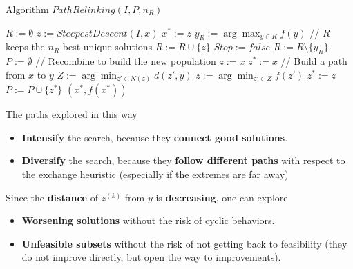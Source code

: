 \documentclass[11pt]{article}
\begin{document}
	\newpage
	
	\begin{algorithm}[H]
		\caption{Algorithm $PathRelinking(I , P, n_R )$}
		\begin{algorithmic}
			\REPEAT
				\STATE $R := \emptyset$
					\STATE $z := SteepestDescent(I , x)$
						\STATE $x^\ast := z$
					\ENDIF
					\STATE $y_R := \arg \max_{y\in R} f (y )$
						\STATE // $R$ keeps the $n_R$ best unique solutions
						\STATE $R := R \cup \{z\}$ 
						\STATE $Stop := false$
						\IF{$|R| > n_R$}
							\STATE $R := R \setminus \{y_R \}$
						\ENDIF
					\ENDIF
				\ENDFOR
				\STATE $P := \emptyset$
					\STATE // Recombine to build the new population
					\STATE $z := x$
					\STATE $z^\ast := x$
						\STATE // Build a path from $x$ to $y$
						\STATE $Z := \arg \min_{z' \in N(z)} d (z', y )$
						\STATE $z := \arg \min_{z' \in Z} f (z')$
							\STATE $z^\ast := z$
						\ENDIF
					\ENDWHILE
						\STATE $P := P \cup \{z^\ast\}$
					\ENDIF
				\ENDFOR
			\RETURN $(x^\ast, f (x^\ast))$
		\end{algorithmic}
	\end{algorithm}
	
	\newpage
	
	The paths explored in this way
	\begin{itemize}
		\item \textbf{Intensify} the search, because they \textbf{connect good solutions}.\\
		
		\item \textbf{Diversify} the search, because they \textbf{follow different paths} with respect to the exchange heuristic (especially if the extremes are far away)
	\end{itemize}
	
	Since the \textbf{distance} of $z^{(k)}$ from $y$ is \textbf{decreasing}, one can explore 
	\begin{itemize}
		\item \textbf{Worsening solutions} without the risk of cyclic behaviors.\\
		
		\item \textbf{Unfeasible subsets} without the risk of not getting back to feasibility (they do not improve directly, but open the way to improvements).\\
	\end{itemize}
	
\end{document}
